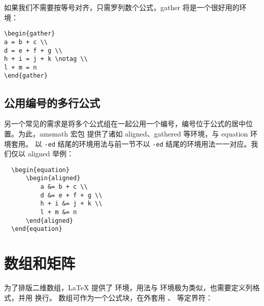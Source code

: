 如果我们不需要按等号对齐，只需罗列数个公式，gather 将是一个很好用的环境：
\begin{lstlisting}
\begin{gather}
a = b + c \\
d = e + f + g \\
h + i = j + k \notag \\
l + m = n
\end{gather}
\end{lstlisting}
\begin{center}
\end{center}
\subsection{公用编号的多行公式}
另一个常见的需求是将多个公式组在一起公用一个编号，编号位于公式的居中位置。为此，amsmath 宏包
提供了诸如 aligned、gathered 等环境，与 equation 环境套用。
以 \texttt{-ed} 结尾的环境用法与前一节不以 \texttt{-ed} 结尾的环境用法一一对应。我们仅以 aligned 举例：
\begin{lstlisting}
  \begin{equation}
	  \begin{aligned}
		  a &= b + c \\
		  d &= e + f + g \\
		  h + i &= j + k \\
		  l + m &= n
	  \end{aligned}
  \end{equation}
\end{lstlisting}
\begin{center}
\end{center}
\section{数组和矩阵}
为了排版二维数组，\LaTeX{} 提供了  环境，用法与  环境极为类似，也需要定义列格式，并用 \crcmd{} 换行。
数组可作为一个公式块，在外套用 、 等定界符：

